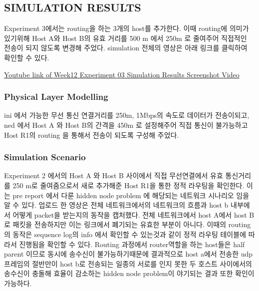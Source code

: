 \subsection*{SIMULATION RESULTS}
    Experiment 3에서는 routing을 하는 3개의 host를 추가한다. 이때 routing에 의미가 있기위해 Host A와 Host B의 유효 거리를 500 m 에서 250m 로 줄여주어 직접적인 전송이 되지 않도록 변경해 주었다. 
    simulation 전체의 영상은 아래 링크를 클릭하여 확인할 수 있다.     
    \vspace{-10mm}
        \begin{center}
            \item \href{https://www.youtube.com/watch?v=WlI24BkZjFs&ab_channel=anamnesis}
        	{Youtube link of Week12 Experiment 03 Simulation Results Screenshot Video}
        \end{center}
    \vspace{-6mm}
        
\vspace{-3mm}
    \subsubsection*{Physical Layer Modelling}
    \vspace{-2mm}
    ini 에서 가능한 무선 통신 연결거리를 250m, 1Mbps의 속도로 데이터가 전송이되고, ned 에서 Host A 와 Host B의 간격을 450m 로 설정해주어 직접 통신이 불가능하고 Host R1의 routing 을 통해서 전송이 되도록 구성해 주었다. 
    \subsubsection*{Simulation Scenario}
    \vspace{-2mm}
    Experiment 2 에서의 Host A 와 Host B 사이에서 직접 무선연결에서 유효 통신거리를 250 m로 줄여줌으로서 새로 추가해준 Host R1을 통한 정적 라우팅을 확인한다. 이는 pre report 에서 다룬 hidden node problem 에 해당되는 네트워크 시나리오 임을 알 수 있다. 
    업로드 한 영상은 전체 네트워크에서의 네트워크의 흐름과 host b 내부에서 어떻게 packet을 받는지의 동작을 캡처했다. 
    전체 네트워크에서 host A에서 host B로 패킷을 전송하지만 이는 링크에서 폐기되는 유효한 부분이 아니다. 이때의 routing 의 동작은 sequence log의 info 에서 확인할 수 있는것과 같이 정적 라우팅 테이블에 따라서 진행됨을 확인할 수 있다. 
    Routing 과정에서 router역할을 하는 host들은 half parent 이므로 동시에 송수신이 불가능하기때문에 결과적으로 host a에서 전송한 udp 프레임의 절반만이 host b로 전송되는 일종의 서로를 인지 못한 두 호스트 사이에서의 송수신이 충돌해 효율이 감소하는 hidden node problem이 야기되는 결과 또한 확인이 가능하다.
